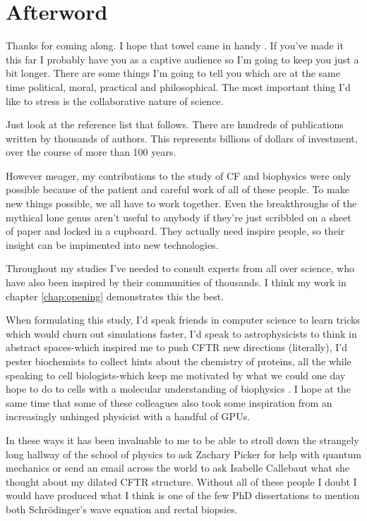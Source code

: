 \chapter{Afterword}
\label{chap:Afterword}
\chapquote {}{}

 Thanks for coming along. I hope that towel came in handy \cite{adamd1979}. If you've made it this far I probably have you as a captive audience so I'm going to keep you just a bit longer. There are some things I'm going to tell you which are at the same time political, moral, practical and philosophical. The most important thing I'd like to stress is the collaborative nature of science.

Just look at the reference list that follows. There are hundreds of publications written by thousands of authors. This represents billions of dollars of investment, over the course of more than 100 years. 

However meager, my contributions to the study of CF and biophysics were only possible because of the patient and careful work of all of these people. To make new things possible, we all have to work together. Even the breakthroughs of the mythical lone genus aren't useful to anybody if they're just scribbled on a sheet of paper and locked in a cupboard. They actually need inspire people, so their insight can be impimented into new technologies.

Throughout my studies I've needed to consult experts from all over science, who have also been inspired by their communities of thousands. I think my work in chapter \ref{chap:opening} demonstrates this the best. 

When formulating this study, I'd speak friends in computer science to learn tricks which would churn out simulations faster, I'd speak to astrophysicists to think in abstract spaces-which inspired me to push CFTR new directions (literally), I'd pester biochemists to collect hints about the chemistry of proteins, all the while speaking to cell biologists-which keep me motivated by what we could one day hope to do to cells with a molecular understanding of biophysics \cite{}. I hope at the same time that some of these colleagues also took some inspiration from an increasingly unhinged physicist with a handful of GPUs. 

In these ways it has been invaluable to me to be able to stroll down the strangely long hallway of the school of physics to ask Zachary Picker for help with quantum mechanics or send an email across the world to ask Isabelle Callebaut what she thought about my dilated CFTR structure. Without all of these people I doubt I would have produced what I think is one of the few PhD dissertations to mention both Schr\"odinger's wave equation and rectal biopsies. 

